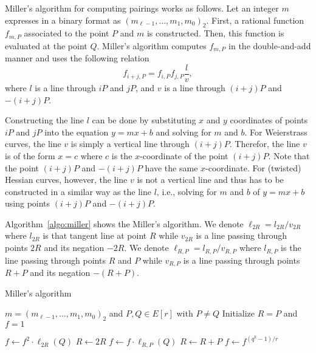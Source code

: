 Miller's algorithm for computing pairings works as follows.
Let an integer $m$ expresses in a binary format as $(m_{\ell-1},\dots,m_1,m_0)_2$.
First, a rational function $f_{m,P}$ associated to the point $P$ and $m$ is constructed.
Then, this function is evaluated at the point $Q$.
Miller's algorithm computes $f_{m,P}$ in the double-and-add manner
and uses the following relation
$$ f_{i+j,P} = f_{i,P} f_{j,P} \frac{l}{v}, $$
where $l$ is a line through $iP$ and $jP$,
and $v$ is a line through $(i+j)P$ and $-(i+j)P$.

Constructing the line $l$ can be done by substituting $x$ and $y$ coordinates of points $iP$ and $jP$
into the equation $y = mx + b$ and solving for $m$ and $b$.
For Weierstrass curves, the line $v$ is simply a vertical line through $(i+j)P$.
Therefor, the line $v$ is of the form $x = c$ where $c$ is the $x$-coordinate of the point $(i+j)P$.
Note that the point $(i+j)P$ and $-(i+j)P$ have the same $x$-coordinate.
For (twisted) Hessian curves, however, the line $v$ is not a vertical line
and thus has to be constructed in a similar way as the line $l$,
i.e., solving for $m$ and $b$ of $y = mx + b$ using points $(i+j)P$ and $-(i+j)P$.

Algorithm~\ref{algo:miller} shows the Miller's algorithm.
We denote $\ell_{2R} = l_{2R} / v_{2R}$ where $l_{2R}$ is that tangent line at point $R$
while $v_{2R}$ is a line passing through points $2R$ and its negation $-2R$.
We denote $\ell_{R,P} = l_{R,P} / v_{R,P}$ where $l_{R,P}$ is the line passing through points $R$ and $P$
while $v_{R,P}$ is a line passing through points $R+P$ and its negation $-(R+P)$.

\begin{algorithm}
\caption{Miller's algorithm}
\label{algo:miller}
\begin{algorithmic}[1]

	\Require $m = (m_{\ell-1}, \dots, m_1, m_0)_2$ and $P,Q \in E[r]$ with $P \ne Q$
	\State Initialize $R = P$ and $f = 1$

		\State $f \leftarrow f^2 \cdot \ell_{2R}(Q)$
		\State $R \leftarrow 2R$
			\State $f \leftarrow f \cdot \ell_{R,P}(Q)$
			\State $R \leftarrow R+P$
		\EndIf
	\EndFor
	\State $f \leftarrow f^{(q^k-1)/r}$

\end{algorithmic}
\end{algorithm}

